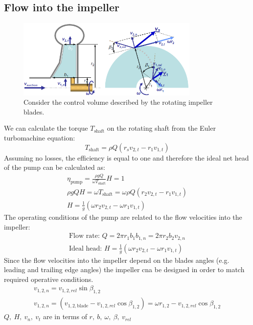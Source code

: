 \documentclass[class=report, crop=false, 12pt,a4paper]{standalone}
\begin{document}
\subsection{Flow into the impeller}
\begin{figure}[H]
  \centering
  \includegraphics[width = 0.8\textwidth]{../img/diagram9.png}
  \caption{Consider the control volume described by the rotating impeller blades.}
\end{figure}
We can calculate the torque $T_{\textrm{shaft}}$ on the rotating shaft from the Euler turbomachine equation:
\begin{equation}
  T_{\textrm{shaft}} = \rho Q (r_s v_{2,t} - r_1 v_{1,t})
\end{equation}
Assuming no losses, the efficiency is equal to one and therefore the ideal net head of the pump can be calculated as:
\begin{gather}
  \eta_{\textrm{pump}} = \frac{\rho g Q}{\omega T_{\textrm{shaft}}}H = 1\\ 
  \rho g QH = \omega T_{\textrm{shaft}} = \omega\rho Q (r_2v_{2,t} - r_1 v_{1,t})\\
  H = \frac{1}{g}(\omega r_2 v_{2,t} - \omega r_1 v_{1,t})
\end{gather}
The operating conditions of the pump are related to the flow velocities into the impeller:
\begin{gather}
  \textrm{Flow rate: } Q = 2\pi r_1 b_1 b_{1,n} = 2\pi r_2 b_2 v_{2,n}\\
  \textrm{Ideal head: } H = \frac{1}{g}(\omega r_2 v_{2,t} - \omega r_1 v_{1,t})
\end{gather}
Since the flow velocities into the impeller depend on the blades angles (e.g. leading and trailing edge angles) the impeller cna be designed in order to match required operative conditions.
\begin{gather}
  v_{1,2,n} = v_{1,2,rel} \sin{\beta_{1,2}}\\
  v_{1,2,n} = (v_{1,2,\textrm{blade}} - v_{1,2,rel} \cos{\beta_{1,2}}) = \omega r_{1,2} - v_{1,2,rel} \cos{\beta_{1,2}}
\end{gather}
$Q, \ H, \ v_n, \ v_t$ are in terms of $r, \ b, \ \omega, \ \beta, \ v_{rel}$
\end{document}
